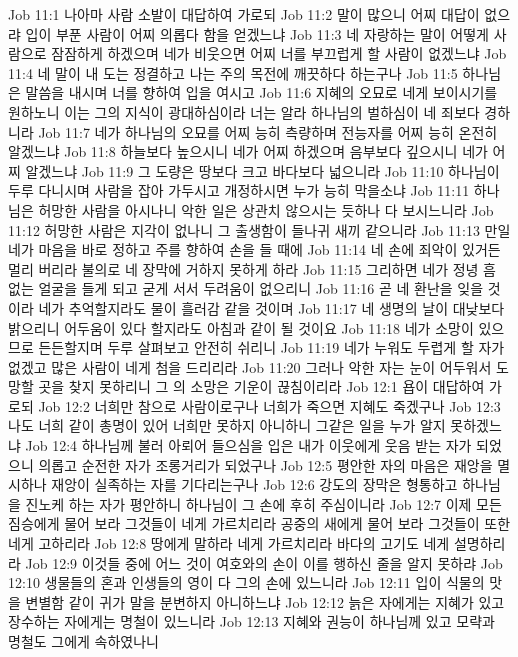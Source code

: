 Job 11:1  나아마 사람 소발이 대답하여 가로되
Job 11:2  말이 많으니 어찌 대답이 없으랴 입이 부푼 사람이 어찌 의롭다 함을 얻겠느냐
Job 11:3  네 자랑하는 말이 어떻게 사람으로 잠잠하게 하겠으며 네가 비웃으면 어찌 너를 부끄럽게 할 사람이 없겠느냐
Job 11:4  네 말이 내 도는 정결하고 나는 주의 목전에 깨끗하다 하는구나
Job 11:5  하나님은 말씀을 내시며 너를 향하여 입을 여시고
Job 11:6  지혜의 오묘로 네게 보이시기를 원하노니 이는 그의 지식이 광대하심이라 너는 알라 하나님의 벌하심이 네 죄보다 경하니라
Job 11:7  네가 하나님의 오묘를 어찌 능히 측량하며 전능자를 어찌 능히 온전히 알겠느냐
Job 11:8  하늘보다 높으시니 네가 어찌 하겠으며 음부보다 깊으시니 네가 어찌 알겠느냐
Job 11:9  그 도량은 땅보다 크고 바다보다 넓으니라
Job 11:10  하나님이 두루 다니시며 사람을 잡아 가두시고 개정하시면 누가 능히 막을소냐
Job 11:11  하나님은 허망한 사람을 아시나니 악한 일은 상관치 않으시는 듯하나 다 보시느니라
Job 11:12  허망한 사람은 지각이 없나니 그 출생함이 들나귀 새끼 같으니라
Job 11:13  만일 네가 마음을 바로 정하고 주를 향하여 손을 들 때에
Job 11:14  네 손에 죄악이 있거든 멀리 버리라 불의로 네 장막에 거하지 못하게 하라
Job 11:15  그리하면 네가 정녕 흠 없는 얼굴을 들게 되고 굳게 서서 두려움이 없으리니
Job 11:16  곧 네 환난을 잊을 것이라 네가 추억할지라도 물이 흘러감 같을 것이며
Job 11:17  네 생명의 날이 대낮보다 밝으리니 어두움이 있다 할지라도 아침과 같이 될 것이요
Job 11:18  네가 소망이 있으므로 든든할지며 두루 살펴보고 안전히 쉬리니
Job 11:19  네가 누워도 두렵게 할 자가 없겠고 많은 사람이 네게 첨을 드리리라
Job 11:20  그러나 악한 자는 눈이 어두워서 도망할 곳을 찾지 못하리니 그 의 소망은 기운이 끊침이리라
Job 12:1  욥이 대답하여 가로되
Job 12:2  너희만 참으로 사람이로구나 너희가 죽으면 지혜도 죽겠구나
Job 12:3  나도 너희 같이 총명이 있어 너희만 못하지 아니하니 그같은 일을 누가 알지 못하겠느냐
Job 12:4  하나님께 불러 아뢰어 들으심을 입은 내가 이웃에게 웃음 받는 자가 되었으니 의롭고 순전한 자가 조롱거리가 되었구나
Job 12:5  평안한 자의 마음은 재앙을 멸시하나 재앙이 실족하는 자를 기다리는구나
Job 12:6  강도의 장막은 형통하고 하나님을 진노케 하는 자가 평안하니 하나님이 그 손에 후히 주심이니라
Job 12:7  이제 모든 짐승에게 물어 보라 그것들이 네게 가르치리라 공중의 새에게 물어 보라 그것들이 또한 네게 고하리라
Job 12:8  땅에게 말하라 네게 가르치리라 바다의 고기도 네게 설명하리라
Job 12:9  이것들 중에 어느 것이 여호와의 손이 이를 행하신 줄을 알지 못하랴
Job 12:10  생물들의 혼과 인생들의 영이 다 그의 손에 있느니라
Job 12:11  입이 식물의 맛을 변별함 같이 귀가 말을 분변하지 아니하느냐
Job 12:12  늙은 자에게는 지혜가 있고 장수하는 자에게는 명철이 있느니라
Job 12:13  지혜와 권능이 하나님께 있고 모략과 명철도 그에게 속하였나니
